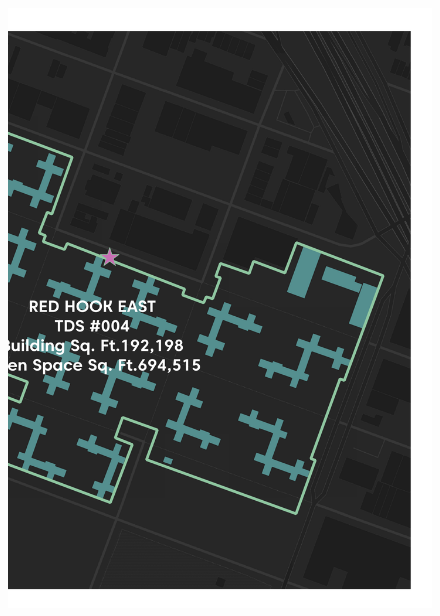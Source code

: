 {{\begin{figure}[H]
    \end{figure}
    \clearpage
    \begin{figure}[H]
    	\raggedright
        \includegraphics[height=11in]{004_2.png}%
    \end{figure}
    \clearpage
    }%
}
\restoregeometry
\pagebreak
\pagestyle{plain}
\pagecolor{ccorange}
\pagebreak
{}
\pagestyle{fancy}
\fancyhf{}
\renewcommand{\chaptermark}[1]{\markboth{#1}{}}
\fancyfoot[LE,RO]{\thepage}

